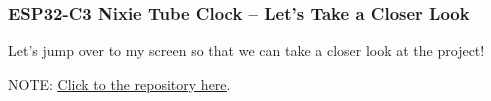 \documentclass{beamer}
\begin{document}
    \begin{frame}
        \frametitle{ESP32-C3 Nixie Tube Clock -- Let's Take a Closer Look}

        Let's jump over to my screen so that we can take a closer look at the project!

        NOTE: \href{https://github.com/newell/nixie-clock-esp32c3}{\underline{Click to the repository here}}.

    \end{frame}
\end{document}
